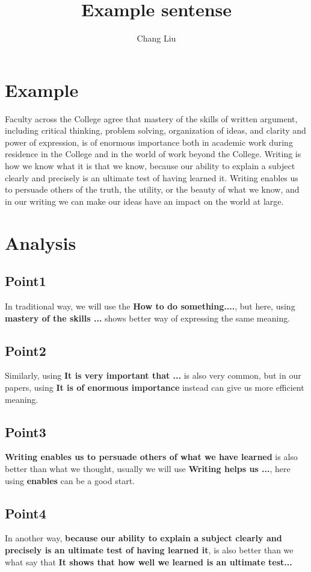 \documentclass{article}
\author{Chang Liu}
\title{Example sentense}
\begin{document}
\maketitle


\section{Example}
Faculty across the College agree that mastery of the skills of written argument, including critical thinking, problem solving, organization of ideas, and clarity and power of expression, is of enormous importance both in academic work during residence in the College and in the world of work beyond the College. Writing is how we know what it is that we know, because our ability to explain a subject clearly and precisely is an ultimate test of having learned it. Writing enables us to persuade others of the truth, the utility, or the beauty of what we know, and in our writing we can make our ideas have an impact on the world at large.



\section{Analysis}

\subsection{Point1}
In traditional way, we will use the \textbf{How to do something....}, but here, using \textbf{mastery of the skills ...} shows better way of expressing the same meaning.

\subsection{Point2}
Similarly, using \textbf{It is very important that ...} is also very common, but in our papers, using \textbf{It is of enormous importance} instead can give us more efficient meaning.

\subsection{Point3}
\textbf{Writing enables us to persuade others of what we have learned} is also better than what we thought, usually we will use \textbf{ Writing helps us ...}, here using \textbf{enables} can be a good start.

\subsection{Point4}
In another way, \textbf{because our ability to explain a subject clearly and precisely is an ultimate test of having learned it}, is also better than we what say that \textbf{It shows that how well we learned is an ultimate test...}
\end{document}
